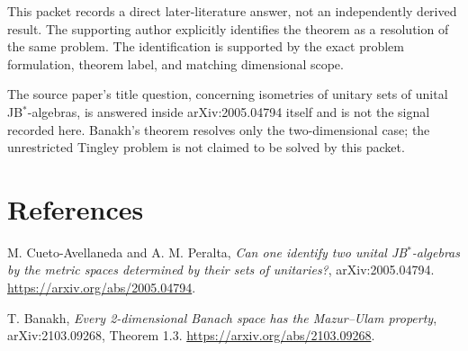 \documentclass[10pt]{article}
\begin{document}
This packet records a direct later-literature answer, not an independently
derived result. The supporting author explicitly identifies the theorem as a
resolution of the same problem. The identification is supported by the exact
problem formulation, theorem label, and matching dimensional scope.

The source paper's title question, concerning isometries of unitary sets of
unital JB$^*$-algebras, is answered inside arXiv:2005.04794 itself and is not
the signal recorded here. Banakh's theorem resolves only the two-dimensional
case; the unrestricted Tingley problem is not claimed to be solved by this
packet.

\section*{References}

M. Cueto-Avellaneda and A. M. Peralta,
\emph{Can one identify two unital JB$^*$-algebras by the metric spaces
determined by their sets of unitaries?}, arXiv:2005.04794.
\url{https://arxiv.org/abs/2005.04794}.

T. Banakh, \emph{Every 2-dimensional Banach space has the Mazur--Ulam
property}, arXiv:2103.09268, Theorem 1.3.
\url{https://arxiv.org/abs/2103.09268}.
\end{document}
